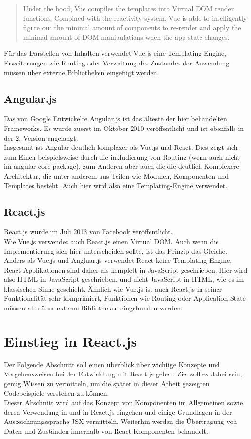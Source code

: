 \begin{quote}
  Under the hood, Vue compiles the templates into Virtual DOM render functions. Combined with the reactivity system, Vue is able to intelligently figure out the minimal amount of components to re-render and apply the minimal amount of DOM manipulations when the app state changes.
\end{quote}

Für das Darstellen von Inhalten verwendet Vue.js eine Templating-Engine, Erweiterungen wie Routing oder Verwaltung des Zustandes der Anwendung müssen über externe Bibliotheken eingefügt werden.

\subsection{Angular.js}
Das von Google Entwickelte Angular.js ist das älteste der hier behandelten Frameworks. Es wurde zuerst im Oktober 2010 veröffentlicht und ist ebenfalls in der 2. Version angelangt.\\
Insgesamt ist Angular deutlich komplexer als  Vue.js und React. Dies zeigt sich zum Einen beispielsweise durch die inkludierung von Routing (wenn auch nicht im angular core package), zum Anderen aber auch die die deutlich Komplexere Architektur, die unter anderem aus Teilen wie Modulen, Komponenten und Templates besteht. Auch hier wird also eine Templating-Engine verwendet.

\subsection{React.js}
React.js wurde im Juli 2013 von Facebook veröffentlicht.\\
Wie Vue.js verwendet auch React.js einen Virtual DOM. Auch wenn die Implementierung sich hier unterscheiden sollte, ist das Prinzip das Gleiche.
Anders als Vue.js und Angluar.js verwendet React keine Templating Engine, React Applikationen sind daher als komplett in JavaScript geschrieben. Hier wird also HTML in JavaScript geschrieben, und nicht JavaScript in HTML, wie es im klassischen Sinne geschieht.
Ähnlich wie Vue.js ist auch React.js in seiner Funktionalität sehr komprimiert, Funktionen wie Routing oder Application State müssen also über externe Bibliotheken eingebunden werden.

\section{Einstieg in React.js}
Der Folgende Abschnitt soll einen überblick über wichtige Konzepte und Vorgehensweisen bei der Entwicklung mit React.js geben. Ziel soll es dabei sein, genug Wissen zu vermitteln, um die später in dieser Arbeit gezeigten Codebeispiele verstehen zu können.\\
Dieser Abschnitt wird auf das Konzept von Komponenten im Allgemeinen sowie deren Verwendung in und in React.js eingehen und einige Grundlagen in der Auszeichnungssprache JSX vermitteln. Weiterhin werden die Übertragung von Daten und Zuständen innerhalb von React Komponenten behandelt.

